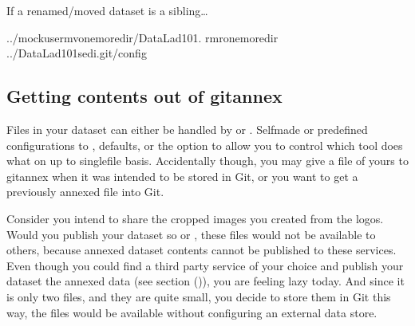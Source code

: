 \begin{findoutmore}[label={fom-adjust-sibling-urls}, before title={\thetcbcounter\ }, check odd page=true]{If a renamed/moved dataset is a sibling…}
\begin{sphinxVerbatim}[commandchars=\\\{\}]
../mock\PYGZus{}usermvonemoredir/DataLad\PYGZhy{}101.
rm\PYGZhy{}ronemoredir
../DataLad\PYGZhy{}101sed\PYGZhy{}i.git/config
\end{sphinxVerbatim}


\end{findoutmore}


\subsection{Getting contents out of git\sphinxhyphen{}annex}
\label{\detokenize{basics/101-136-filesystem:getting-contents-out-of-git-annex}}
\sphinxAtStartPar
Files in your dataset can either be handled by {\hyperref[\detokenize{glossary:term-Git}]{}} or {\hyperref[\detokenize{glossary:term-git-annex}]{}}.
Self\sphinxhyphen{}made or predefined configurations to , defaults, or the
 option to  allow you to control which tool
does what on up to single\sphinxhyphen{}file basis. Accidentally though, you may give a file of yours
to git\sphinxhyphen{}annex when it was intended to be stored in Git, or you want to get a previously
annexed file into Git.

\sphinxAtStartPar
Consider you intend to share the cropped  images you created from the
 logos. Would you publish your  dataset so {\hyperref[\detokenize{glossary:term-GitHub}]{}}
or {\hyperref[\detokenize{glossary:term-GitLab}]{}}, these files would not be available to others, because annexed
dataset contents cannot be published to these services.
Even though you could find a third party service of your choice
and publish your dataset  the annexed data (see section {\hyperref[\detokenize{basics/101-138-sharethirdparty:sharethirdparty}]{}} ()),
you are feeling lazy today. And since it
is only two files, and they are quite small, you decide to store them in Git \textendash{}
this way, the files would be available without configuring an external data
store.

